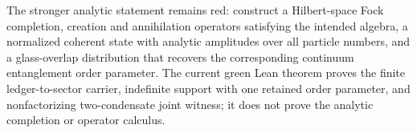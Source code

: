 \begin{theorem}\label{thm:analytic-fock-coherent-field-frontier}\notready{}
The stronger analytic statement remains red: construct a Hilbert-space Fock
completion, creation and annihilation operators satisfying the intended algebra,
a normalized coherent state with analytic amplitudes over all particle numbers,
and a glass-overlap distribution that recovers the corresponding continuum
entanglement order parameter.  The current green Lean theorem proves the finite
ledger-to-sector carrier, indefinite support with one retained order parameter,
and nonfactorizing two-condensate joint witness; it does not prove the analytic
completion or operator calculus.
\end{theorem}

